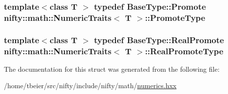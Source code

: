 \subsubsection[{Promote\+Type}]{\setlength{\rightskip}{0pt plus 5cm}template$<$class T $>$ typedef Base\+Type\+::\+Promote {\bf nifty\+::math\+::\+Numeric\+Traits}$<$ T $>$\+::{\bf Promote\+Type}}\label{structnifty_1_1math_1_1NumericTraits_a001a907b6cbeaaf29fb52ff31261e811}
\hypertarget{structnifty_1_1math_1_1NumericTraits_a5030d5141aa16424cd49d272306cd716}{}
\subsubsection[{Real\+Promote\+Type}]{\setlength{\rightskip}{0pt plus 5cm}template$<$class T $>$ typedef Base\+Type\+::\+Real\+Promote {\bf nifty\+::math\+::\+Numeric\+Traits}$<$ T $>$\+::{\bf Real\+Promote\+Type}}\label{structnifty_1_1math_1_1NumericTraits_a5030d5141aa16424cd49d272306cd716}


The documentation for this struct was generated from the following file\+:\begin{DoxyCompactItemize}
\item 
/home/tbeier/src/nifty/include/nifty/math/\hyperlink{numerics_8hxx}{numerics.\+hxx}\end{DoxyCompactItemize}

